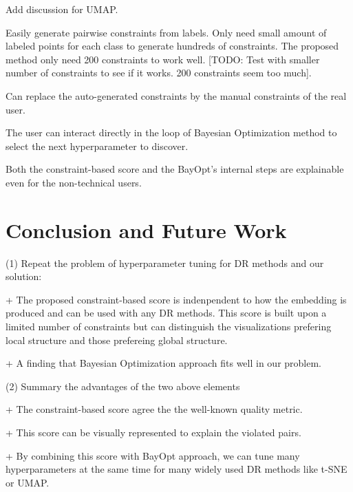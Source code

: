 \par
Add discussion for UMAP.

\par
Easily generate pairwise constraints from labels.
  Only need small amount of labeled points for each class to generate hundreds of constraints.
  The proposed method only need 200 constraints to work well.
  [TODO: Test with smaller number of constraints to see if it works. 200 constraints seem too much].

\par
Can replace the auto-generated constraints by the manual constraints of the real user.

\par
The user can interact directly in the loop of Bayesian Optimization method to select the next hyperparameter to discover.


\par
Both the constraint-based score and the BayOpt's internal steps are explainable even for the non-technical users. 



\section{Conclusion and Future Work}

\par (1) Repeat the problem of hyperparameter tuning for DR methods and our solution:

+ The proposed constraint-based score is indenpendent to how the embedding is produced and can be used with any DR methods.
This score is built upon a limited number of constraints but can distinguish the visualizations prefering local structure and those prefereing global structure.

+ A finding that Bayesian Optimization approach fits well in our problem.


\vspace{8pt}
\par (2) Summary the advantages of the two above elements

+ The constraint-based score agree the the well-known quality metric.

+ This score can be visually represented to explain the violated pairs.

+ By combining this score with BayOpt approach, we can tune many hyperparameters at the same time for many widely used DR methods like t-SNE or UMAP.

